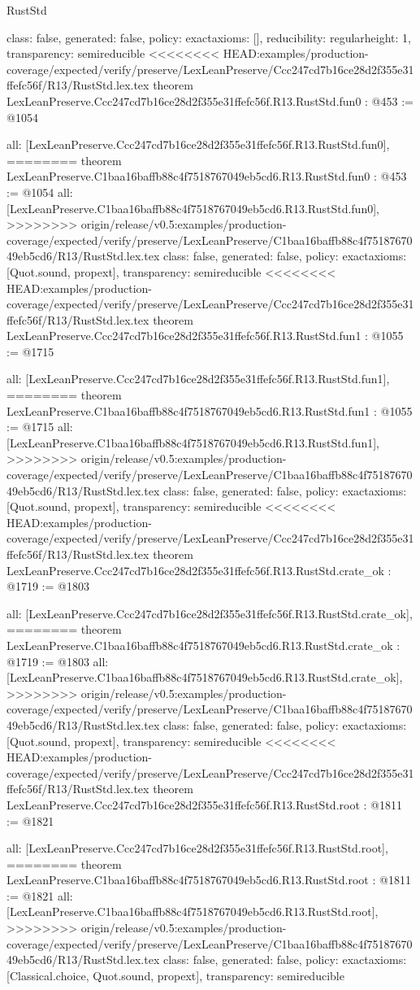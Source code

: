 \begin{lexlean}{RustStd}
\begin{coremodule}
{\begin{coremodule}
{{{  class: false,
  generated: false,
  policy: exact{axioms: []},
  reducibility: regular{height: 1},
  transparency: semireducible
}
<<<<<<<< HEAD:examples/production-coverage/expected/verify/preserve/LexLeanPreserve/Ccc247cd7b16ce28d2f355e31ffefc56f/R13/RustStd.lex.tex
theorem LexLeanPreserve.Ccc247cd7b16ce28d2f355e31ffefc56f.R13.RustStd.fun0 : @453 := @1054 {
  all: [LexLeanPreserve.Ccc247cd7b16ce28d2f355e31ffefc56f.R13.RustStd.fun0],
========
theorem LexLeanPreserve.C1baa16baffb88c4f7518767049eb5cd6.R13.RustStd.fun0 : @453 := @1054 {
  all: [LexLeanPreserve.C1baa16baffb88c4f7518767049eb5cd6.R13.RustStd.fun0],
>>>>>>>> origin/release/v0.5:examples/production-coverage/expected/verify/preserve/LexLeanPreserve/C1baa16baffb88c4f7518767049eb5cd6/R13/RustStd.lex.tex
  class: false,
  generated: false,
  policy: exact{axioms: [Quot.sound, propext]},
  transparency: semireducible
}
<<<<<<<< HEAD:examples/production-coverage/expected/verify/preserve/LexLeanPreserve/Ccc247cd7b16ce28d2f355e31ffefc56f/R13/RustStd.lex.tex
theorem LexLeanPreserve.Ccc247cd7b16ce28d2f355e31ffefc56f.R13.RustStd.fun1 : @1055 := @1715 {
  all: [LexLeanPreserve.Ccc247cd7b16ce28d2f355e31ffefc56f.R13.RustStd.fun1],
========
theorem LexLeanPreserve.C1baa16baffb88c4f7518767049eb5cd6.R13.RustStd.fun1 : @1055 := @1715 {
  all: [LexLeanPreserve.C1baa16baffb88c4f7518767049eb5cd6.R13.RustStd.fun1],
>>>>>>>> origin/release/v0.5:examples/production-coverage/expected/verify/preserve/LexLeanPreserve/C1baa16baffb88c4f7518767049eb5cd6/R13/RustStd.lex.tex
  class: false,
  generated: false,
  policy: exact{axioms: [Quot.sound, propext]},
  transparency: semireducible
}
<<<<<<<< HEAD:examples/production-coverage/expected/verify/preserve/LexLeanPreserve/Ccc247cd7b16ce28d2f355e31ffefc56f/R13/RustStd.lex.tex
theorem LexLeanPreserve.Ccc247cd7b16ce28d2f355e31ffefc56f.R13.RustStd.crate_ok : @1719 := @1803 {
  all: [LexLeanPreserve.Ccc247cd7b16ce28d2f355e31ffefc56f.R13.RustStd.crate_ok],
========
theorem LexLeanPreserve.C1baa16baffb88c4f7518767049eb5cd6.R13.RustStd.crate_ok : @1719 := @1803 {
  all: [LexLeanPreserve.C1baa16baffb88c4f7518767049eb5cd6.R13.RustStd.crate_ok],
>>>>>>>> origin/release/v0.5:examples/production-coverage/expected/verify/preserve/LexLeanPreserve/C1baa16baffb88c4f7518767049eb5cd6/R13/RustStd.lex.tex
  class: false,
  generated: false,
  policy: exact{axioms: [Quot.sound, propext]},
  transparency: semireducible
}
<<<<<<<< HEAD:examples/production-coverage/expected/verify/preserve/LexLeanPreserve/Ccc247cd7b16ce28d2f355e31ffefc56f/R13/RustStd.lex.tex
theorem LexLeanPreserve.Ccc247cd7b16ce28d2f355e31ffefc56f.R13.RustStd.root : @1811 := @1821 {
  all: [LexLeanPreserve.Ccc247cd7b16ce28d2f355e31ffefc56f.R13.RustStd.root],
========
theorem LexLeanPreserve.C1baa16baffb88c4f7518767049eb5cd6.R13.RustStd.root : @1811 := @1821 {
  all: [LexLeanPreserve.C1baa16baffb88c4f7518767049eb5cd6.R13.RustStd.root],
>>>>>>>> origin/release/v0.5:examples/production-coverage/expected/verify/preserve/LexLeanPreserve/C1baa16baffb88c4f7518767049eb5cd6/R13/RustStd.lex.tex
  class: false,
  generated: false,
  policy: exact{axioms: [Classical.choice, Quot.sound, propext]},
  transparency: semireducible
}

}}}}}}
\end{coremodule}}
\end{coremodule}
\end{lexlean}

